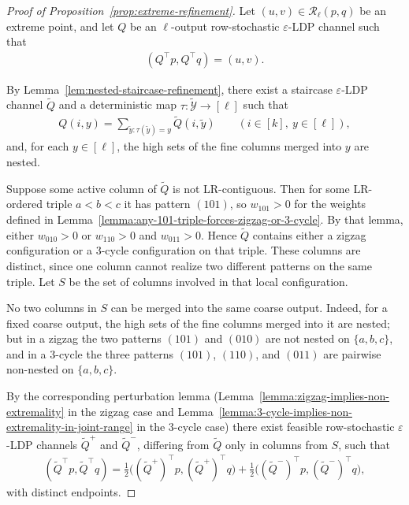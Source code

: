 \documentclass{article}
\theoremstyle{plain}
\theoremstyle{definition}
\theoremstyle{plain}
\begin{document}
\begin{proof}[Proof of Proposition~\ref{prop:extreme-refinement}]
Let $(u,v)\in \mathcal R_\ell(p,q)$ be an extreme point, and let $Q$ be an $\ell$-output row-stochastic $\varepsilon$-LDP channel such that
\begin{align*}
    (Q^\top p,Q^\top q)=(u,v).
\end{align*}

By Lemma~\ref{lem:nested-staircase-refinement}, there exist a staircase $\varepsilon$-LDP channel $\widetilde Q$ and a deterministic map $\tau:\widetilde{\mathcal Y}\to[\ell]$ such that
\begin{align*}
    Q(i,y)=\sum_{\tilde y:\tau(\tilde y)=y}\widetilde Q(i,\tilde y)
    \qquad (i\in[k],\ y\in[\ell]),
\end{align*}
and, for each $y\in[\ell]$, the high sets of the fine columns merged into $y$ are nested.

Suppose some active column of $\widetilde Q$ is not LR-contiguous. Then for some LR-ordered triple $a<b<c$ it has pattern $(101)$, so $w_{101}>0$ for the weights defined in Lemma~\ref{lemma:any-101-triple-forces-zigzag-or-3-cycle}. By that lemma, either $w_{010}>0$ or $w_{110}>0$ and $w_{011}>0$. Hence $\widetilde Q$ contains either a zigzag configuration or a $3$-cycle configuration on that triple. These columns are distinct, since one column cannot realize two different patterns on the same triple. Let $S$ be the set of columns involved in that local configuration.

No two columns in $S$ can be merged into the same coarse output. Indeed, for a fixed coarse output, the high sets of the fine columns merged into it are nested; but in a zigzag the two patterns $(101)$ and $(010)$ are not nested on $\{a,b,c\}$, and in a $3$-cycle the three patterns $(101)$, $(110)$, and $(011)$ are pairwise non-nested on $\{a,b,c\}$.

By the corresponding perturbation lemma (Lemma~\ref{lemma:zigzag-implies-non-extremality} in the zigzag case and Lemma~\ref{lemma:3-cycle-implies-non-extremality-in-joint-range} in the $3$-cycle case) there exist feasible row-stochastic $\varepsilon$-LDP channels $\widetilde Q^+$ and $\widetilde Q^-$, differing from $\widetilde Q$ only in columns from $S$, such that
\begin{align*}
    (\widetilde Q^\top p,\widetilde Q^\top q)
    =
    \tfrac12\bigl((\widetilde Q^+)^\top p,(\widetilde Q^+)^\top q\bigr)
    +
    \tfrac12\bigl((\widetilde Q^-)^\top p,(\widetilde Q^-)^\top q\bigr),
\end{align*}
with distinct endpoints.


\end{proof}
\end{document}
